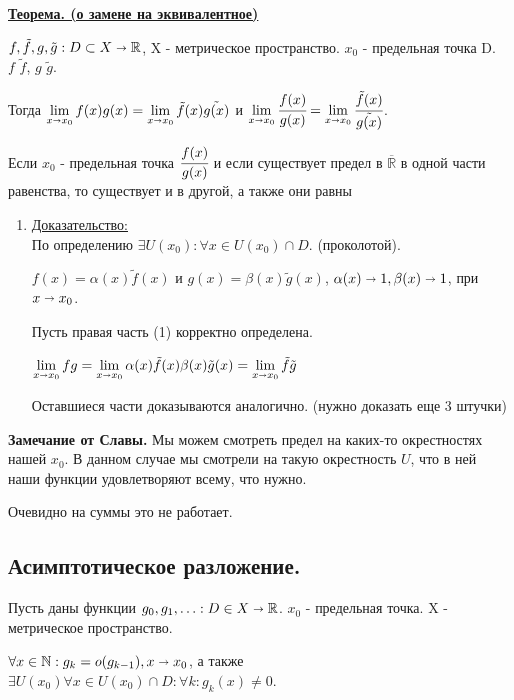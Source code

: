 \documentclass{article}
\newcommand{\thmm}[1]{\underline{\textbf{#1}}}
\newcommand{\prooff}[1]{{\underline{Доказательство:}} \\ }
\newcommand{\mytilde}{\raisebox{0.5ex}{\texttildelow}}
\begin{document}
\thmm{Теорема. (о замене на эквивалентное)}

$f,\tilde{f},g,\tilde{g}: D \subset X \shortrightarrow \mathbb{R}$, X - метрическое пространство. $x_0$ - предельная точка D.\,\, $f$ \mytilde $\tilde{f}$, $g$ \mytilde $\tilde{g}$.

Тогда $\lim\limits_{x\shortrightarrow x_0} f(x)g(x) = \lim\limits_{x\shortrightarrow x_0} \tilde{f}(x) \tilde{g(x)}$ и $\lim\limits_{x\shortrightarrow x_0} \cfrac{f(x)}{g(x)} = \lim\limits_{x\shortrightarrow x_0} \cfrac{\tilde{f}(x)}{ \tilde{g(x)}}$. 

Если $x_0$ - предельная точка $\cfrac{f(x)}{g(x)}$ и если существует предел в $\overline{\mathbb{R}}$ в одной части равенства, то существует и в другой, а также они равны

\begin{enumerate}
    \item[] \prooff{}
    По определению $\exists U(x_0): \forall x \in U(x_0) \cap D$. (проколотой).

    $f(x) = \alpha(x) \tilde{f}(x)$ и  $g(x) = \beta(x) \tilde{g}(x)$, 
    $\alpha(x) \shortrightarrow 1, \beta(x) \shortrightarrow 1$, при $x\shortrightarrow x_0$.

    Пусть правая часть (1) корректно определена.

    $\lim\limits_{x\shortrightarrow x_0} fg = \lim\limits_{x\shortrightarrow x_0} \alpha(x) \tilde{f}(x) \beta(x) \tilde{g}(x) = \lim\limits_{x\shortrightarrow x_0}\tilde{f}\tilde{g}$

    Оставшиеся части доказываются аналогично. (нужно доказать еще 3 штучки)
\end{enumerate}

\textbf{Замечание от Славы.} Мы  можем смотреть предел на каких-то окрестностях нашей $x_0$. В данном случае мы смотрели на такую окрестность $U$, что в ней наши функции удовлетворяют всему, что нужно.

Очевидно на суммы это не работает. 

\subsection{Асимптотическое разложение.}

Пусть даны функции $g_0,g_1,\ldots : D \in X \shortrightarrow \mathbb{R}$. $x_0$ - предельная точка. X - метрическое пространство.

$\forall x \in \mathbb{N}: g_k = o(g_{k-1}), x\shortrightarrow x_0$, а также $\exists U(x_0) \forall x \in U(x_0)\cap D: \forall k: g_k(x) \neq 0$.
\end{document}
